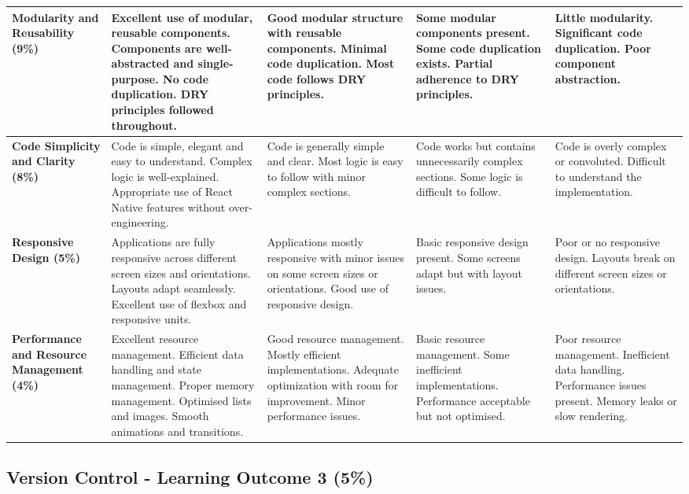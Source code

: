 \documentclass{article}
\begin{document}
\begin{landscape}
\begin{tabular}{|p{5cm}|p{4cm}|p{4cm}|p{4cm}|p{4cm}|}
\textbf{Modularity and Reusability (9\%)} & 
Excellent use of modular, reusable components. Components are well-abstracted and single-purpose. No code duplication. DRY principles followed throughout. & 
Good modular structure with reusable components. Minimal code duplication. Most code follows DRY principles. & 
Some modular components present. Some code duplication exists. Partial adherence to DRY principles. & 
Little modularity. Significant code duplication. Poor component abstraction. \\ \hline

\textbf{Code Simplicity and Clarity (8\%)} & 
Code is simple, elegant and easy to understand. Complex logic is well-explained. Appropriate use of React Native features without over-engineering. & 
Code is generally simple and clear. Most logic is easy to follow with minor complex sections. & 
Code works but contains unnecessarily complex sections. Some logic is difficult to follow. & 
Code is overly complex or convoluted. Difficult to understand the implementation. \\ \hline

\textbf{Responsive Design (5\%)} & 
Applications are fully responsive across different screen sizes and orientations. Layouts adapt seamlessly. Excellent use of flexbox and responsive units. & 
Applications mostly responsive with minor issues on some screen sizes or orientations. Good use of responsive design. & 
Basic responsive design present. Some screens adapt but with layout issues. & 
Poor or no responsive design. Layouts break on different screen sizes or orientations. \\ \hline

\textbf{Performance and Resource Management (4\%)} & 
Excellent resource management. Efficient data handling and state management. Proper memory management. Optimised lists and images. Smooth animations and transitions. & 
Good resource management. Mostly efficient implementations. Adequate optimization with room for improvement. Minor performance issues. & 
Basic resource management. Some inefficient implementations. Performance acceptable but not optimised. & 
Poor resource management. Inefficient data handling. Performance issues present. Memory leaks or slow rendering. \\ \hline

\end{tabular}

\subsection*{Version Control - Learning Outcome 3 (5\%)}


\end{landscape}
\end{document}
